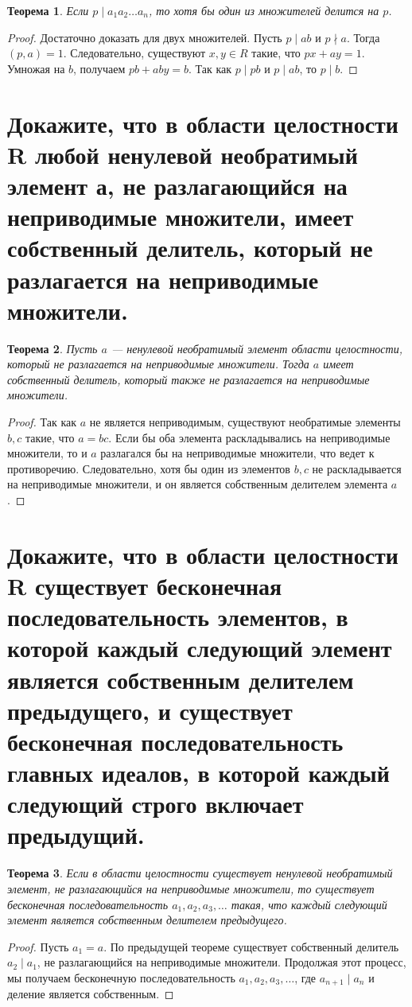 \documentclass[12pt, a4paper]{article}
\theoremstyle{definition}
\theoremstyle{plain}
\newtheorem{theorem}{Теорема}[section]
\begin{document}
	\begin{theorem}
		Если $p \mid a_1 a_2 \dots a_n$, то хотя бы один из множителей делится на $p$.
	\end{theorem}
	\begin{proof}
		Достаточно доказать для двух множителей. Пусть $p \mid ab$ и $p \nmid a$. Тогда $(p,a)=1$. Следовательно, существуют $x,y \in R$ такие, что $px+ay=1$. Умножая на $b$, получаем $pb+aby=b$. Так как $p \mid pb$ и $p \mid ab$, то $p \mid b$.
	\end{proof}
	
	\newpage
	\section{Докажите, что в области целостности R любой ненулевой необратимый элемент а, не разлагающийся на неприводимые множители, имеет собственный делитель, который не разлагается на неприводимые множители.}
	
	\begin{theorem}
		Пусть $a$ — ненулевой необратимый элемент области целостности, который не разлагается на неприводимые множители. Тогда $a$ имеет собственный делитель, который также не разлагается на неприводимые множители.
	\end{theorem}
	\begin{proof}
		Так как $a$ не является неприводимым, существуют необратимые элементы $b, c$ такие, что $a=bc$. Если бы оба элемента раскладывались на неприводимые множители, то и $a$ разлагался бы на неприводимые множители, что ведет к противоречию. Следовательно, хотя бы один из элементов $b, c$ не раскладывается на неприводимые множители, и он является собственным делителем элемента $a$.
	\end{proof}
	
	\newpage
	\section{Докажите, что в области целостности R существует бесконечная последовательность элементов, в которой каждый следующий элемент является собственным делителем предыдущего, и существует бесконечная последовательность главных идеалов, в которой каждый следующий строго включает предыдущий.}
	
	\begin{theorem}
		Если в области целостности существует ненулевой необратимый элемент, не разлагающийся на неприводимые множители, то существует бесконечная последовательность $a_1, a_2, a_3, \dots$ такая, что каждый следующий элемент является собственным делителем предыдущего.
	\end{theorem}
	\begin{proof}
		Пусть $a_1 = a$. По предыдущей теореме существует собственный делитель $a_2 \mid a_1$, не разлагающийся на неприводимые множители. Продолжая этот процесс, мы получаем бесконечную последовательность $a_1, a_2, a_3, \dots$, где $a_{n+1} \mid a_n$ и деление является собственным.
	\end{proof}
	
\end{document}
